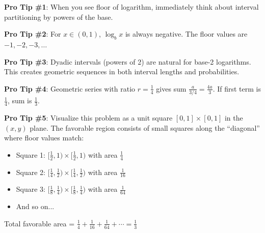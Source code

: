 \documentclass[11pt]{article}
\begin{document}
\begin{tipbox}
\textbf{Pro Tip \#1}: When you see floor of logarithm, immediately think about interval partitioning by powers of the base.

\textbf{Pro Tip \#2}: For $x \in (0,1)$, $\log_b x$ is always negative. The floor values are $-1, -2, -3, \ldots$

\textbf{Pro Tip \#3}: Dyadic intervals (powers of 2) are natural for base-2 logarithms. This creates geometric sequences in both interval lengths and probabilities.

\textbf{Pro Tip \#4}: Geometric series with ratio $r = \frac{1}{4}$ gives sum $\frac{a}{3/4} = \frac{4a}{3}$. If first term is $\frac{1}{4}$, sum is $\frac{1}{3}$.

\textbf{Pro Tip \#5}: Visualize this problem as a unit square $[0,1] \times [0,1]$ in the $(x,y)$ plane. The favorable region consists of small squares along the ``diagonal'' where floor values match:
\begin{itemize}
    \item Square 1: $[\frac{1}{2}, 1) \times [\frac{1}{2}, 1)$ with area $\frac{1}{4}$
    \item Square 2: $[\frac{1}{4}, \frac{1}{2}) \times [\frac{1}{4}, \frac{1}{2})$ with area $\frac{1}{16}$
    \item Square 3: $[\frac{1}{8}, \frac{1}{4}) \times [\frac{1}{8}, \frac{1}{4})$ with area $\frac{1}{64}$
    \item And so on...
\end{itemize}
Total favorable area = $\frac{1}{4} + \frac{1}{16} + \frac{1}{64} + \cdots = \frac{1}{3}$
\end{tipbox}
\end{document}
